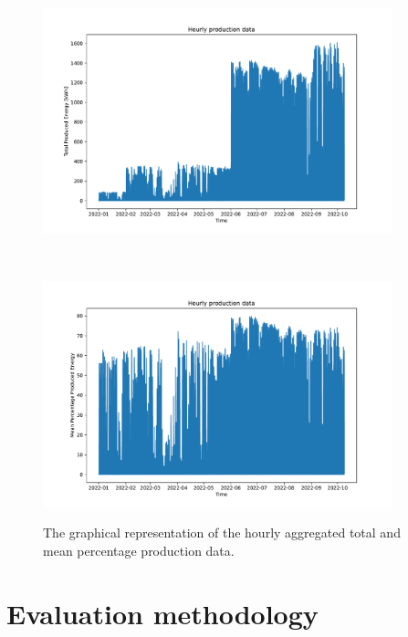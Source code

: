 \begin{figure}[H]
\begin{minipage}[b]{8.5cm}
\centering
\includegraphics[width=0.9\textwidth]{images/production/data_plot}
\subcaption{}
\label{fig:productiondataplot}
\end{minipage}
\ \hspace{2mm} \
\begin{minipage}[b]{8.5cm}
\centering
\includegraphics[width=0.9\textwidth]{images/production/data_plot_percentage}
\subcaption{}
\label{fig:productiondataplotpercentage}
\end{minipage}
\caption{The graphical representation of the hourly aggregated  total and  mean percentage production data.}
\end{figure}


\section{Evaluation methodology}
\label{sec:methodology}
\vspace{0.2 cm}

